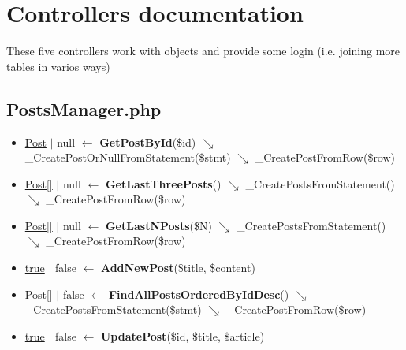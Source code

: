 \section{Controllers documentation}
\par These five controllers work with objects and provide some login (i.e. joining more tables in varios ways)
\subsection{PostsManager.php}
\begin{itemize}
  \setlength\itemsep{0em}
  \item \underline{Post} $\vert$ null $\leftarrow$ \textbf{GetPostById}(\$id) $\searrow$ \_CreatePostOrNullFromStatement(\$stmt) $\searrow$ \_CreatePostFromRow(\$row)
  \item \underline{Post[]} $\vert$ null $\leftarrow$ \textbf{GetLastThreePosts}() $\searrow$ \_CreatePostsFromStatement() $\searrow$ \_CreatePostFromRow(\$row)
  \item \underline{Post[]} $\vert$ null $\leftarrow$ \textbf{GetLastNPosts}(\$N) $\searrow$ \_CreatePostsFromStatement() $\searrow$ \_CreatePostFromRow(\$row)
  \item \underline{true} $\vert$ false $\leftarrow$ \textbf{AddNewPost}(\$title, \$content)
  \item \underline{Post[]} $\vert$ false $\leftarrow$ \textbf{FindAllPostsOrderedByIdDesc}() $\searrow$ \_CreatePostsFromStatement(\$stmt) $\searrow$ \_CreatePostFromRow(\$row)
  \item \underline{true} $\vert$ false $\leftarrow$ \textbf{UpdatePost}(\$id, \$title, \$article)
\end{itemize}
